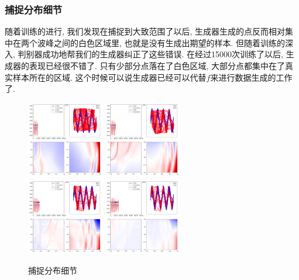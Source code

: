 \documentclass[lang=cn,11pt]{elegantpaper}
\begin{document}
\subsubsection{捕捉分布细节}

随着训练的进行, 我们发现在捕捉到大致范围了以后, 生成器生成的点反而相对集中在两个波峰之间的白色区域里, 也就是没有生成出期望的样本. 但随着训练的深入, 判别器成功地帮我们的生成器纠正了这些错误. 在经过15000次训练了以后, 生成器的表现已经很不错了. 只有少部分点落在了白色区域, 大部分点都集中在了真实样本所在的区域. 这个时候可以说生成器已经可以代替$f$来进行数据生成的工作了. 
\begin{figure}[htbp]
\centering
  \includegraphics[width=0.3\textwidth]{sin_3_1}
  \includegraphics[width=0.3\textwidth]{sin_3_2}\\
  \includegraphics[width=0.3\textwidth]{sin_3_3}
  \includegraphics[width=0.3\textwidth]{sin_3_4}
  \caption{捕捉分布细节}
\end{figure}
\end{document}
